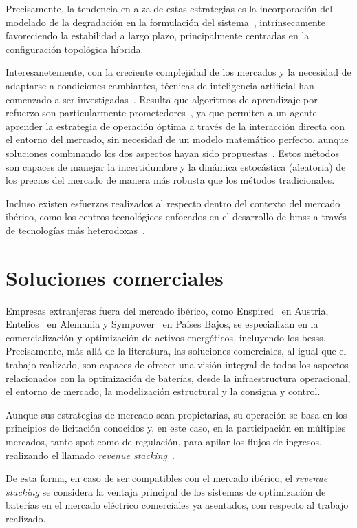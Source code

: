 Precisamente, la tendencia en alza de estas estrategias es la incorporación del modelado de la degradación en la formulación del sistema~\cite{liu2022milp, minh2024mixed, spiller2020aging}, intrínsecamente favoreciendo la estabilidad a largo plazo, principalmente centradas en la configuración topológica híbrida.

Interesanetemente, con la creciente complejidad de los mercados y la necesidad de adaptarse a condiciones cambiantes, técnicas de inteligencia artificial han comenzado a ser investigadas~\cite{haratian2024machine, krishna2024advanced}. Resulta que algoritmos de aprendizaje por refuerzo son particularmente prometedores~\cite{dong2021strategic}, ya que permiten a un agente aprender la estrategia de operación óptima a través de la interacción directa con el entorno del mercado, sin necesidad de un modelo matemático perfecto, aunque soluciones combinando los dos aspectos hayan sido propuestas~\cite{georgiadis2025hybrid}. Estos métodos son capaces de manejar la incertidumbre y la dinámica estocástica (aleatoria) de los precios del mercado de manera más robusta que los métodos tradicionales.

Incluso existen esfuerzos realizados al respecto dentro del contexto del mercado ibérico, como los centros tecnológicos enfocados en el desarrollo de \glspl{bms} a través de tecnologías más heterodoxas~\cite{ikerlan2025bateria}.

\section{Soluciones comerciales}%
\label{makereference2.3}

Empresas extranjeras fuera del mercado ibérico, como Enspired~\cite{enspired2025battery} en Austria, Entelios~\cite{entelios2025cross} en Alemania y Sympower~\cite{sympower2025battery} en Países Bajos, se especializan en la comercialización y optimización de activos energéticos, incluyendo los \glspl{bess}. Precisamente, más allá de la literatura, las soluciones comerciales, al igual que el trabajo realizado, son capaces de ofrecer una visión integral de todos los aspectos relacionados con la optimización de baterías, desde la infraestructura operacional, el entorno de mercado, la modelización estructural y la consigna y control.

Aunque sus estrategias de mercado sean propietarias, su operación se basa en los principios de licitación conocidos y, en este caso, en la participación en múltiples mercados, tanto spot como de regulación, para apilar los flujos de ingresos, realizando el llamado \textit{revenue stacking}~\cite{rancilio2022revenue}.

De esta forma, en caso de ser compatibles con el mercado ibérico, el \textit{revenue stacking} se considera la ventaja principal de los sistemas de optimización de baterías en el mercado eléctrico comerciales ya asentados, con respecto al trabajo realizado.
